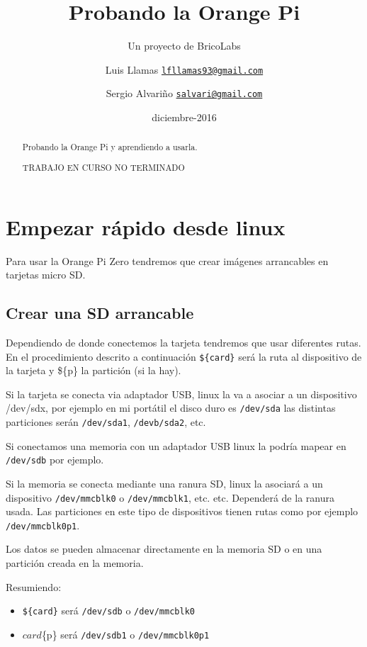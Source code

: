 \documentclass[12pt,spanish,]{scrartcl}
\title{Probando la Orange Pi}
\subtitle{Un proyecto de BricoLabs}
\author{Luis Llamas
\href{mailto:lfllamas93@gmail.com}{\nolinkurl{lfllamas93@gmail.com}} \and Sergio Alvariño
\href{mailto:salvari@gmail.com}{\nolinkurl{salvari@gmail.com}}}
\institute{BricoLabs}
\date{diciembre-2016}
\providecommand{\tightlist}{%
  \setlength{\itemsep}{0pt}\setlength{\parskip}{0pt}}
\begin{document}
\maketitle
\begin{abstract}
Probando la Orange Pi y aprendiendo a usarla.

TRABAJO EN CURSO NO TERMINADO
\end{abstract}

{
\hypersetup{linkcolor=}
\setcounter{tocdepth}{3}
\tableofcontents
}
\hypertarget{empezar-ruxe1pido-desde-linux}{%
\section{Empezar rápido desde
linux}\label{empezar-ruxe1pido-desde-linux}}

Para usar la Orange Pi Zero tendremos que crear imágenes arrancables en
tarjetas micro SD.

\hypertarget{crear-una-sd-arrancable}{%
\subsection{Crear una SD arrancable}\label{crear-una-sd-arrancable}}

Dependiendo de donde conectemos la tarjeta tendremos que usar diferentes
rutas. En el procedimiento descrito a continuación \texttt{\$\{card\}}
será la ruta al dispositivo de la tarjeta y \$\{p\} la partición (si la
hay).

Si la tarjeta se conecta via adaptador USB, linux la va a asociar a un
dispositivo /dev/sdx, por ejemplo en mi portátil el disco duro es
\texttt{/dev/sda} las distintas particiones serán \texttt{/dev/sda1},
\texttt{/devb/sda2}, etc.

Si conectamos una memoria con un adaptador USB linux la podría mapear en
\texttt{/dev/sdb} por ejemplo.

Si la memoria se conecta mediante una ranura SD, linux la asociará a un
dispositivo \texttt{/dev/mmcblk0} o \texttt{/dev/mmcblk1}, etc. etc.
Dependerá de la ranura usada. Las particiones en este tipo de
dispositivos tienen rutas como por ejemplo \texttt{/dev/mmcblk0p1}.

Los datos se pueden almacenar directamente en la memoria SD o en una
partición creada en la memoria.

Resumiendo:

\begin{itemize}
\tightlist
\item
  \texttt{\$\{card\}} será \texttt{/dev/sdb} o \texttt{/dev/mmcblk0}
\item
  \({card}\)\{p\} será \texttt{/dev/sdb1} o \texttt{/dev/mmcblk0p1}
\end{itemize}
\end{document}
